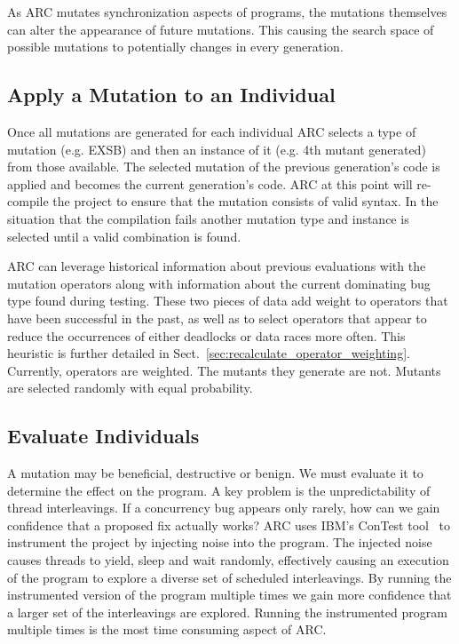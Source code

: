 \documentclass{llncs}
\begin{document}
As ARC mutates synchronization aspects of programs, the mutations themselves
can alter the appearance of future mutations. This causing the search space of
possible mutations to potentially changes in every generation.

\subsection{Apply a Mutation to an Individual}
\label{sec:mutate_individuals}

Once all mutations are generated for each individual ARC selects a type of
mutation (e.g. EXSB) and then an instance of
it (e.g. 4th mutant generated) from those available. The
selected mutation of the previous generation's code is applied and becomes the current
generation's code. ARC at this point will re-compile the project to ensure that
the mutation consists of valid syntax. In the situation that the compilation
fails another mutation type and instance is selected until a valid combination is
found.

ARC can leverage historical information about previous evaluations with the
mutation operators along with information about the current dominating bug type
found during testing. These two pieces of data add weight to operators
that have been successful in the past, as well as to select operators that
appear to reduce the occurrences of either deadlocks or data races more often.
This heuristic is further detailed in
Sect.~\ref{sec:recalculate_operator_weighting}. Currently, operators are weighted.
The mutants they generate are not.  Mutants are selected randomly with equal
probability.

\subsection{Evaluate Individuals}
\label{sec:evalute_individuals}

A mutation may be beneficial, destructive or benign. We must evaluate it to
determine the effect on the program. A key problem is the unpredictability of
thread interleavings. If a concurrency bug appears only rarely, how can we gain
confidence that a proposed fix actually works? ARC uses IBM's ConTest
tool~\cite{EFN+02} to instrument the project by injecting noise into the
program. The injected noise causes threads to yield, sleep and wait randomly,
effectively causing an execution of the program to explore a diverse set of
scheduled interleavings. By running the instrumented version of the
program multiple times we gain more confidence that a larger set of the
interleavings are explored. Running the instrumented program multiple times is
the most time consuming aspect of ARC.
\end{document}
